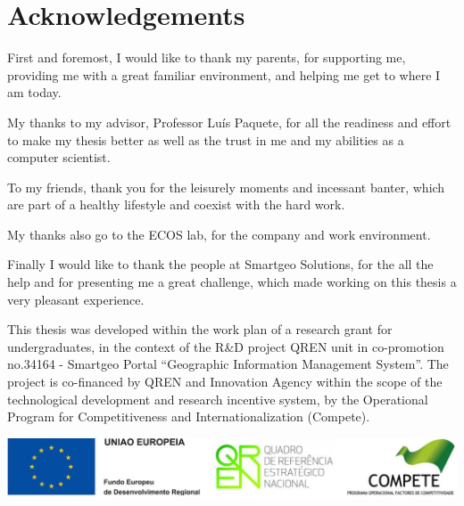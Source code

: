 

\cleardoublepage
\pagestyle{plain}

\cleardoublepage
\chapter*{Acknowledgements}
\onehalfspacing
\large First and foremost, I would like to thank my parents, for supporting me, providing me with a great familiar environment, and helping me get to where I am today. 

My thanks to my advisor, Professor Luís Paquete, for all the readiness and effort to make my thesis better as well as the trust in me and my abilities as a computer scientist. 

To my friends, thank you for the leisurely moments and incessant banter, which are part of a healthy lifestyle and coexist with the hard work. 

My thanks also go to the ECOS lab, for the company and work environment.

Finally I would like to thank the people at Smartgeo Solutions, for the all the help and for presenting me a great challenge, which made working on this thesis a very pleasant experience. 

\singlespacing
\vfill
\small This thesis was developed within the work plan of a research grant for undergraduates, in the context of the R\&D project QREN unit in co-promotion no.34164 - Smartgeo Portal ``Geographic Information Management System''. The project is co-financed by QREN and Innovation Agency within the scope of the technological development and research incentive system, by the Operational Program for Competitiveness and Internationalization (Compete).
\vspace{0.3cm}
\normalsize
\begin{center}
\includegraphics[width=0.7\linewidth]{Pictures/acks}
\end{center}
\cleardoublepage 
\tableofcontents
\cleardoublepage
\listoffigures
\listoftables

